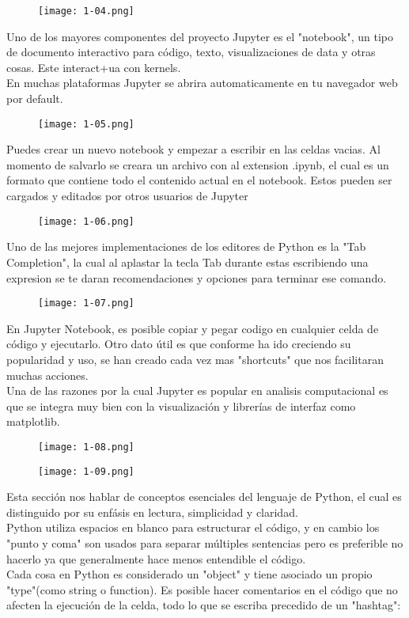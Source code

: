 \documentclass{article}
\begin{document}
\begin{figure}[h]
  \texttt{[image: 1-04.png]}
\end{figure}
Uno de los mayores componentes del proyecto Jupyter es el "notebook", un tipo de documento interactivo para código, texto, visualizaciones de data y otras cosas. Este interact+ua con kernels.\\
En muchas plataformas Jupyter se abrira automaticamente en tu navegador web por default.\\
\begin{figure}[h]
  \texttt{[image: 1-05.png]}
\end{figure}
\clearpage
Puedes crear un nuevo notebook y empezar a escribir en las celdas vacias. Al momento de salvarlo se creara un archivo con al extension .ipynb, el cual es un formato que contiene todo el contenido actual en el notebook. Estos pueden ser cargados y editados por otros usuarios de Jupyter\\
\begin{figure}[h]
  \texttt{[image: 1-06.png]}
\end{figure}
Uno de las mejores implementaciones de los editores de Python es la "Tab Completion", la cual al aplastar la tecla Tab durante estas escribiendo una expresion se te daran recomendaciones y opciones para terminar ese comando.\\
\begin{figure}[h]
  \texttt{[image: 1-07.png]}
\end{figure}
\clearpage
En Jupyter Notebook, es posible copiar y pegar codigo en cualquier celda de código y ejecutarlo. Otro dato útil es que conforme ha ido creciendo su popularidad y uso, se han creado cada vez mas "shortcuts" que nos facilitaran muchas acciones.\\
Una de las razones por la cual Jupyter es popular en analisis computacional es que se integra muy bien con la visualización y librerías de interfaz como matplotlib.
\begin{figure}[h]
  \texttt{[image: 1-08.png]}
\end{figure}
\begin{figure}[h]
  \texttt{[image: 1-09.png]}
\end{figure}
Esta sección nos hablar de conceptos esenciales del lenguaje de Python, el cual es distinguido por su enfásis en lectura, simplicidad y claridad.\\ Python utiliza espacios en blanco para estructurar el código, y en cambio los "punto y coma" son usados para separar múltiples sentencias pero es preferible no hacerlo ya que generalmente hace menos entendible el código.\\ Cada cosa en Python es considerado un "object" y tiene asociado un propio "type"(como string o function). Es posible hacer comentarios en el código que no afecten la ejecución de la celda, todo lo que se escriba precedido de un "hashtag":\\
\end{document}
